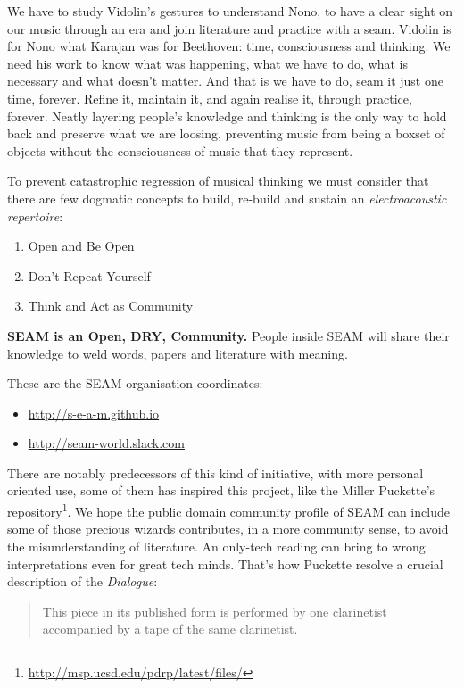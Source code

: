 \documentclass[twoside,a4paper]{article}
\begin{document}
We have to study Vidolin's gestures to understand Nono, to have a clear sight on
our music through an era and join literature and practice with a seam. Vidolin is
for Nono what Karajan was for Beethoven: time, consciousness and thinking. We
need his work to know what was happening, what we have to do, what is necessary
and what doesn't matter. And that is we have to do, seam it just one time,
forever. Refine it, maintain it, and again realise it, through practice, forever.
Neatly layering people's knowledge and thinking is the only way to hold back and
preserve what we are loosing, preventing music from being a boxset of objects
without the consciousness of music that they represent.

To prevent catastrophic regression of musical thinking we must consider that
there are few dogmatic concepts to build, re-build and sustain an
\emph{electroacoustic repertoire}:

\begin{enumerate}
  \item Open and Be Open
  \item Don't Repeat Yourself
  \item Think and Act as Community
\end{enumerate}

\textbf{SEAM is an Open, DRY, Community.} People inside SEAM will share their
knowledge to weld words, papers and literature with meaning.

These are the SEAM organisation coordinates:
\begin{itemize}
\item \url{http://s-e-a-m.github.io}
\item \url{http://seam-world.slack.com}
\end{itemize}

There are notably predecessors of this kind of initiative, with more personal
oriented use, some of them has inspired this project, like the Miller Puckette's
repository\footnote{\url{http://msp.ucsd.edu/pdrp/latest/files/}}. We hope the
public domain community profile of SEAM can include some of those precious
wizards contributes, in a more community sense, to avoid the misunderstanding
of literature. An only-tech reading can bring to wrong interpretations even for
great tech minds. That's how Puckette \cite{mp01} resolve a crucial description
of the \emph{Dialogue}:

\begin{quote}
This piece in its published form is performed by one clarinetist accompanied by
a tape of the same clarinetist.
\end{quote}
\end{document}
